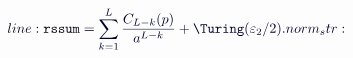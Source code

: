 \documentclass[12pt]{article}
\begin{document}
\makeatletter
\renewcommand*{\@textcolor}[3]{%
  \protect\leavevmode
  \begingroup
    \color#1{#2}#3%
  \endgroup
}
\makeatother
\begin{displaymath}
\mathcolor[RGB]{0,0,15}{line:
\texttt{rssum}} \mathcolor[RGB]{0,0,30}{=} \mathcolor[RGB]{0,0,45}{\sum_{k=1}^{L}\frac{C_{L-k}(p)}{a^{L-k}}+\Turing(\varepsilon_2/2).

norm_str:}
\end{displaymath}
\end{document}
